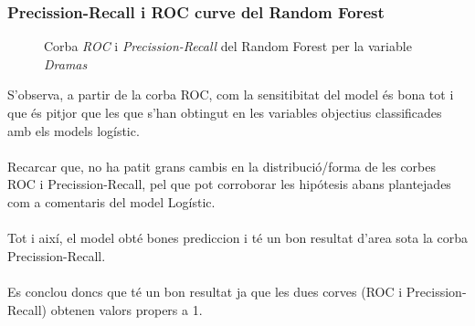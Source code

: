 \documentclass[a4paper, 11pt]{article}
\begin{document}
\subsubsection{Precission-Recall i ROC curve del Random Forest}
\begin{figure}[h]
\centering
    \caption{Corba \textit{ROC} i \textit{Precission-Recall} del Random Forest per la variable \textit{Dramas}}
    \label{fig:my_label}
\end{figure}
\hspace{-1.5em}S'observa, a partir de la corba ROC, com la sensitibitat del model és bona tot i que és pitjor que les que s'han obtingut en les variables objectius classificades amb els models logístic.\\\\
Recarcar que, no ha patit grans cambis en la distribució/forma de les corbes ROC i Precission-Recall, pel que pot corroborar les hipótesis abans plantejades com a comentaris del model Logístic.\\\\
Tot i així, el model obté bones prediccion i té un bon resultat d'area sota la corba Precission-Recall.\\\\
Es conclou doncs que té un bon resultat ja que les dues corves (ROC i Precission-Recall) obtenen valors propers a 1.
\newpage 
\end{document}
